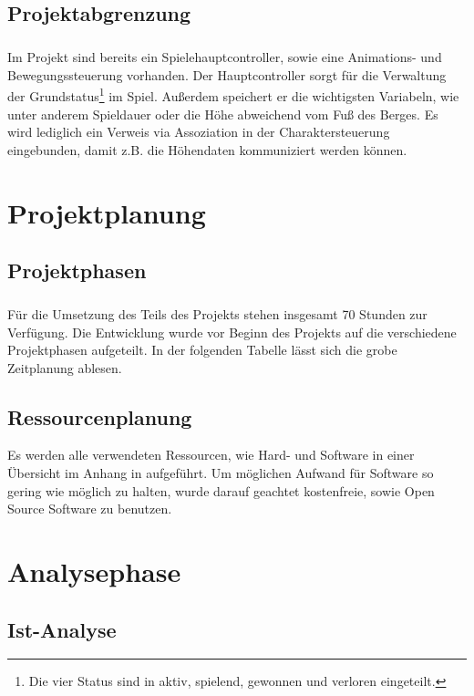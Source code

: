 \section{Projektabgrenzung}
\label{Projektabgrenzung}
\paragraph{}
Im Projekt sind bereits ein Spielehauptcontroller, sowie eine Animations- und Bewegungssteuerung vorhanden.
Der Hauptcontroller sorgt für die Verwaltung der Grundstatus\footnote{Die vier Status sind in aktiv, spielend, gewonnen und verloren eingeteilt.} im Spiel. Außerdem speichert er die wichtigsten Variabeln, wie unter anderem Spieldauer oder die Höhe abweichend vom Fuß des Berges. Es wird lediglich ein Verweis via Assoziation in der Charaktersteuerung eingebunden, damit z.B. die Höhendaten kommuniziert werden können.

\chapter{Projektplanung}
\section{Projektphasen}
\paragraph{}
Für die Umsetzung des Teils des Projekts stehen insgesamt 70 Stunden zur Verfügung. Die Entwicklung wurde vor Beginn des Projekts auf die verschiedene Projektphasen aufgeteilt. In der folgenden Tabelle  lässt sich die grobe Zeitplanung ablesen.\\



\section{Ressourcenplanung}
Es werden alle verwendeten Ressourcen, wie Hard- und Software in einer Übersicht im Anhang in  aufgeführt. Um möglichen Aufwand für Software so gering wie möglich zu halten, wurde darauf geachtet kostenfreie, sowie Open Source Software zu benutzen.

\chapter{Analysephase}
\section{Ist-Analyse}
